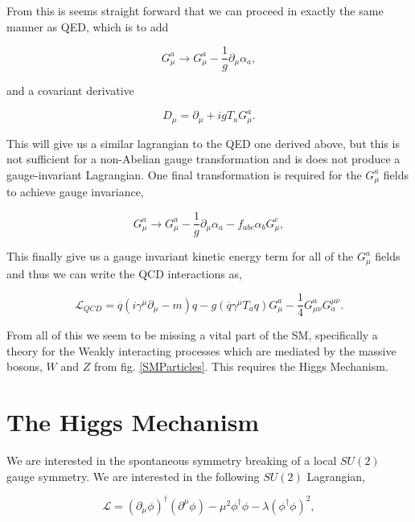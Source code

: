 From this is seems straight forward that we can proceed in exactly the same manner as QED, which is to add

\begin{equation}
G_\mu^a\rightarrow G_\mu^a-\frac{1}{g}\partial_\mu\alpha_a, 
\end{equation}

and a covariant derivative

\begin{equation}
D_\mu=\partial_\mu+igT_aG_\mu^a.
\end{equation}

This will give us a similar lagrangian to the QED one derived above, but this is not sufficient for a non-Abelian gauge transformation and is does not produce a gauge-invariant Lagrangian. One final transformation is required for the $G_\mu^a$ fields to achieve gauge invariance, 

\begin{equation}
G_\mu^a\rightarrow G_\mu^a-\frac{1}{g}\partial_\mu\alpha_a-f_{abc}\alpha_b G_\mu^c,
\end{equation}

This finally give us a gauge invariant kinetic energy term for all of the $G_\mu^a$ fields and thus we can write the QCD interactions as,

\begin{equation}\label{LagrangianQCD}
\mathcal{L}_{QCD}=\overline{q}(i\gamma^\mu\partial_\mu-m)q-g(\overline{q}\gamma^\mu T_a q)G^a_\mu-\frac{1}{4}G^a_{\mu\nu}G_a^{\mu\nu}.
\end{equation}

From all of this we seem to be missing a vital part of the SM, specifically a theory for the Weakly interacting processes which are mediated by the massive bosons, $W$ and $Z$ from fig. \ref{SMParticles}. This requires the Higgs Mechanism.

\section{The Higgs Mechanism}

We are interested in the spontaneous symmetry breaking of a local $SU(2)$ gauge symmetry. We are interested in the following $SU(2)$ Lagrangian,

\begin{equation}\label{HiggsLagrangian}
\mathcal{L}=(\partial_\mu\phi)^\dagger(\partial^\mu\phi)-\mu^2\phi^\dagger\phi-\lambda(\phi^\dagger\phi)^2,
\end{equation}

